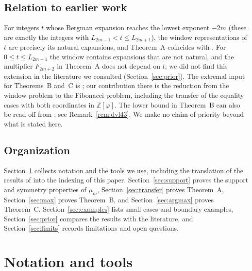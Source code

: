 \documentclass[11pt]{amsart}
\theoremstyle{definition}
\theoremstyle{remark}
\numberwithin{equation}{section}
\newcommand{\Z}{\mathbb{Z}}
\begin{document}
\subsection*{Relation to earlier work}
For integers $t$ whose Bergman expansion reaches the lowest exponent $-2m$ (these are exactly the
integers with $L_{2m-1}<t\le L_{2m+1}$), the window representations of $t$ are precisely its natural
expansions, and Theorem~A coincides with \cite[Theorem~4.4]{DekkingVanLoon2024}. For
$0\le t\le L_{2m-1}$ the window contains expansions that are not natural, and the multiplier
$F_{2m+2}$ in Theorem~A does not depend on $t$; we did not find this extension in the literature we
consulted (Section~\ref{sec:prior}). The extremal input for Theorems~B and~C is
\cite[Theorem~4.7, Lemma~3.1 and Corollary~5.1(i)]{KMP2005}; our contribution there is the reduction
from the window problem to the Fibonacci problem, including the transfer of the equality cases
with both coordinates in $\Z[\varphi]$. The lower bound in Theorem~B can also be read off from
\cite[Theorem~4.3]{DekkingVanLoon2024}; see Remark~\ref{rem:dvl43}. We make no claim of priority
beyond what is stated here.

\subsection*{Organization}
Section~\ref{sec:prelim} collects notation and the tools we use, including the translation of the
results of \cite{KMP2005} into the indexing of this paper. Section~\ref{sec:support} proves the
support and symmetry properties of $\mu_m$, Section~\ref{sec:transfer} proves Theorem~A,
Section~\ref{sec:max} proves Theorem~B, and Section~\ref{sec:argmax} proves Theorem~C.
Section~\ref{sec:examples} lists small cases and boundary examples, Section~\ref{sec:prior} compares
the results with the literature, and Section~\ref{sec:limits} records limitations and open questions.

\section{Notation and tools}\label{sec:prelim}
\end{document}
